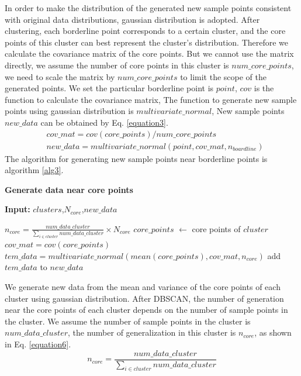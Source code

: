 \documentclass[ida]{iosart2x}
\begin{document}
In order to make the distribution of the generated new sample points 
consistent with original data distributions,
gaussian distribution is adopted.
After clustering, each borderline point corresponds to a certain cluster, 
and the core points of this cluster can best represent the cluster's distribution.
Therefore we calculate the covariance matrix of the core points. 
But we cannot use the matrix directly, we 
assume the number of core points in this cluster is $num\_core\_points$,
we need to scale the matrix by $num\_core\_points$ to limit 
the scope of the generated points.
We set the particular borderline point is $point$, 
$cov$ is the function to calculate the covariance matrix,
The function to generate new sample points using 
gaussian distribution is $multivariate\_normal$,
New sample points $new\_data$ can be obtained by Eq. \ref{equation3}.
\begin{equation}
  \label{equation3}
  \begin{aligned}
      & cov\_mat=cov(core\_points)/num\_core\_points \\
      & new\_data=multivariate\_normal(point,cov\_mat,n_{boardline})
  \end{aligned}
\end{equation}
The algorithm for generating new sample points near borderline points is algorithm \ref{alg3}.

\textbf{Generate data near core points}
\begin{algorithm}[tb]
  \caption{$generate\_core$}
  \label{alg4}
  \hspace*{0.02in} {\bf Input:} $clusters$,$N_{core}$,$new\_data$
  \begin{algorithmic}
    \State $n_{core}=\frac{num\_data\_cluster}{\sum_{i \in cluster} num\_data\_cluster} \times N_{core}$
    \State $core\_points$ $\leftarrow$ core points of $cluster$
    \State $cov\_mat=cov(core\_points)$
    \State $tem\_data=multivariate\_normal(mean(core\_points),cov\_mat,n_{core})$
    \State add $tem\_data$ to $new\_data$
  \EndFor
  \end{algorithmic}
\end{algorithm}
We generate new data from the mean and variance of the 
core points of each cluster using gaussian distribution.
After DBSCAN, 
the number of generation near the core points of each cluster depends 
on the number of sample points in the cluster.
We assume the number of sample points in the cluster is $num\_data\_cluster$, 
 the number of generalization in this cluster is $n_{core}$, as shown in Eq. \ref{equation6}.
 \begin{equation}
  \label{equation6}
  n_{core}=\frac{num\_data\_cluster}{\sum_{i \in cluster} num\_data\_cluster}
\end{equation}
  
\end{document}

